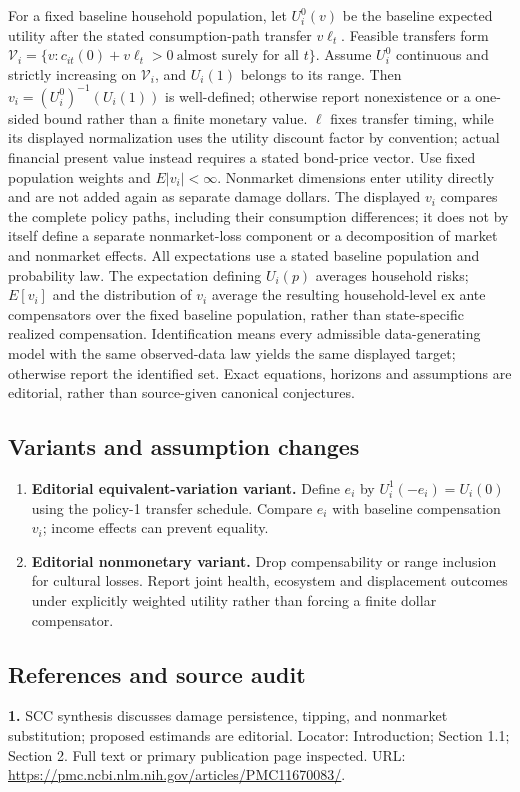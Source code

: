 \documentclass[11pt,a4paper]{article}
\begin{document}
For a fixed baseline household population, let \(U_i^0(v)\) be the baseline expected utility after the stated consumption-path transfer \(v\ell_t\). Feasible transfers form \(\mathcal V_i=\{v:c_{it}(0)+v\ell_t>0\ \text{almost surely for all }t\}\). Assume \(U_i^0\) continuous and strictly increasing on \(\mathcal V_i\), and \(U_i(1)\) belongs to its range. Then \(v_i=(U_i^0)^{-1}(U_i(1))\) is well-defined; otherwise report nonexistence or a one-sided bound rather than a finite monetary value. \(\ell\) fixes transfer timing, while its displayed normalization uses the utility discount factor by convention; actual financial present value instead requires a stated bond-price vector. Use fixed population weights and \(E|v_i|<\infty\). Nonmarket dimensions enter utility directly and are not added again as separate damage dollars. The displayed \(v_i\) compares the complete policy paths, including their consumption differences; it does not by itself define a separate nonmarket-loss component or a decomposition of market and nonmarket effects. All expectations use a stated baseline population and probability law. The expectation defining \(U_i(p)\) averages household risks; \(E[v_i]\) and the distribution of \(v_i\) average the resulting household-level ex ante compensators over the fixed baseline population, rather than state-specific realized compensation. Identification means every admissible data-generating model with the same observed-data law yields the same displayed target; otherwise report the identified set. Exact equations, horizons and assumptions are editorial, rather than source-given canonical conjectures.
\subsection*{Variants and assumption changes}
\begin{enumerate}
\item \textbf{Editorial equivalent-variation variant.} Define \(e_i\) by \(U_i^1(-e_i)=U_i(0)\) using the policy-1 transfer schedule. Compare \(e_i\) with baseline compensation \(v_i\); income effects can prevent equality.
\item \textbf{Editorial nonmonetary variant.} Drop compensability or range inclusion for cultural losses. Report joint health, ecosystem and displacement outcomes under explicitly weighted utility rather than forcing a finite dollar compensator.
\end{enumerate}
\subsection*{References and source audit}
\textbf{1.} SCC synthesis discusses damage persistence, tipping, and nonmarket substitution; proposed estimands are editorial. Locator: Introduction; Section 1.1; Section 2. Full text or primary publication page inspected. URL: \url{https://pmc.ncbi.nlm.nih.gov/articles/PMC11670083/}.
\end{document}
